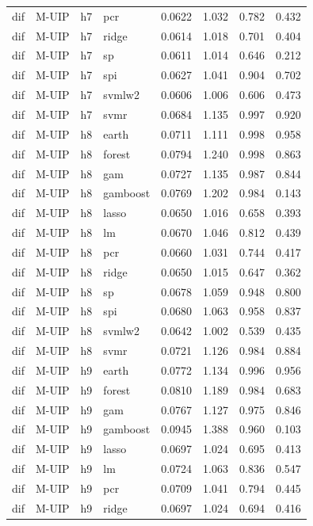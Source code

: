 \begin{ThreePartTable}
\begin{longtable}[t]{llclcccc}
dif & M-UIP & h7 & pcr & 0.0622 & 1.032 & 0.782 & 0.432\\
dif & M-UIP & h7 & ridge & 0.0614 & 1.018 & 0.701 & 0.404\\
dif & M-UIP & h7 & sp & 0.0611 & 1.014 & 0.646 & 0.212\\
dif & M-UIP & h7 & spi & 0.0627 & 1.041 & 0.904 & 0.702\\
dif & M-UIP & h7 & svmlw2 & 0.0606 & 1.006 & 0.606 & 0.473\\
dif & M-UIP & h7 & svmr & 0.0684 & 1.135 & 0.997 & 0.920\\
\addlinespace
dif & M-UIP & h8 & earth & 0.0711 & 1.111 & 0.998 & 0.958\\
dif & M-UIP & h8 & forest & 0.0794 & 1.240 & 0.998 & 0.863\\
dif & M-UIP & h8 & gam & 0.0727 & 1.135 & 0.987 & 0.844\\
dif & M-UIP & h8 & gamboost & 0.0769 & 1.202 & 0.984 & 0.143\\
dif & M-UIP & h8 & lasso & 0.0650 & 1.016 & 0.658 & 0.393\\
dif & M-UIP & h8 & lm & 0.0670 & 1.046 & 0.812 & 0.439\\
dif & M-UIP & h8 & pcr & 0.0660 & 1.031 & 0.744 & 0.417\\
dif & M-UIP & h8 & ridge & 0.0650 & 1.015 & 0.647 & 0.362\\
dif & M-UIP & h8 & sp & 0.0678 & 1.059 & 0.948 & 0.800\\
dif & M-UIP & h8 & spi & 0.0680 & 1.063 & 0.958 & 0.837\\
dif & M-UIP & h8 & svmlw2 & 0.0642 & 1.002 & 0.539 & 0.435\\
dif & M-UIP & h8 & svmr & 0.0721 & 1.126 & 0.984 & 0.884\\
\addlinespace
dif & M-UIP & h9 & earth & 0.0772 & 1.134 & 0.996 & 0.956\\
dif & M-UIP & h9 & forest & 0.0810 & 1.189 & 0.984 & 0.683\\
dif & M-UIP & h9 & gam & 0.0767 & 1.127 & 0.975 & 0.846\\
dif & M-UIP & h9 & gamboost & 0.0945 & 1.388 & 0.960 & 0.103\\
dif & M-UIP & h9 & lasso & 0.0697 & 1.024 & 0.695 & 0.413\\
dif & M-UIP & h9 & lm & 0.0724 & 1.063 & 0.836 & 0.547\\
dif & M-UIP & h9 & pcr & 0.0709 & 1.041 & 0.794 & 0.445\\
dif & M-UIP & h9 & ridge & 0.0697 & 1.024 & 0.694 & 0.416\\

\end{longtable}
\end{ThreePartTable}
